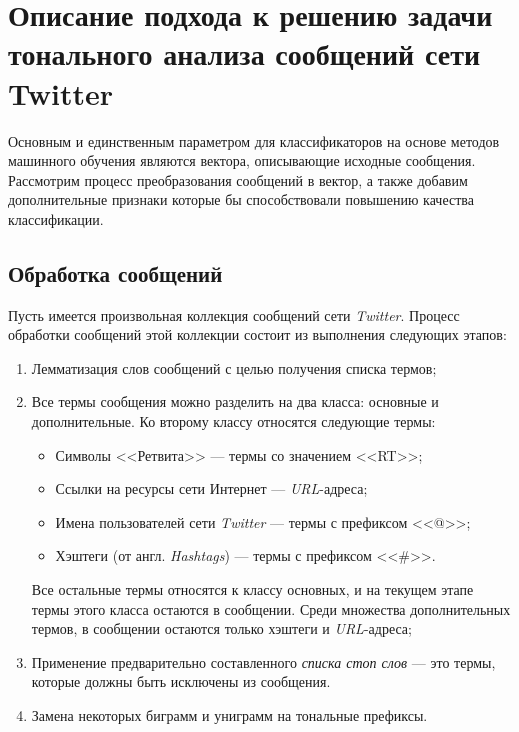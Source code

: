 \newpage
\section{Описание подхода к решению задачи тонального анализа сообщений сети Twitter}
    Основным и единственным параметром для классификаторов на основе методов машинного
    обучения являются вектора, описывающие исходные сообщения.
    Рассмотрим процесс преобразования сообщений в вектор, а также добавим
    дополнительные признаки которые бы способствовали повышению качества
    классификации.

    \subsection{Обработка сообщений}
    Пусть имеется произвольная коллекция сообщений сети {\it Twitter}. Процесс
    обработки сообщений этой коллекции состоит из выполнения следующих этапов:
    \begin{enumerate}
        \item Лемматизация слов сообщений с целью получения списка термов;

        \item Все термы сообщения можно разделить на два класса: основные и
            дополнительные. Ко второму классу относятся следующие термы:
            \begin{itemize}
                \item Символы <<Ретвита>> --- термы со значением <<RT>>;
                \item Ссылки на ресурсы сети Интернет --- {\it URL\hspace{1pt}}-адреса;
                \item Имена пользователей сети {\it Twitter} --- термы с префиксом <<@>>;
                \item Хэштеги (от англ. {\it Hashtags}) --- термы с префиксом <<\#>>.
            \end{itemize}
            Все остальные термы относятся к классу основных, и на текущем этапе
            термы этого класса остаются в сообщении. Среди множества дополнительных
            термов, в сообщении остаются только хэштеги и {\it URL\hspace{1pt}}-адреса;

        \item Применение предварительно составленного {\it списка стоп слов} ---
            это термы, которые должны быть исключены из сообщения.
        \item Замена некоторых биграмм и униграмм на тональные префиксы.
    \end{enumerate}

